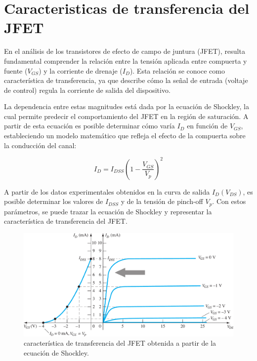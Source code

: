 \chapter{Caracteristicas de transferencia del JFET}
  En el análisis de los transistores de efecto de campo de juntura (JFET), resulta fundamental comprender la relación
  entre la tensión aplicada entre compuerta y fuente (\(V_{GS}\)) y la corriente de drenaje (\(I_D\)). Esta relación se
  conoce como característica de transferencia, ya que describe cómo la señal de entrada (voltaje de control)
  regula la corriente de salida del dispositivo.  

  La dependencia entre estas magnitudes está dada por la ecuación de Shockley, la cual permite predecir el
  comportamiento del JFET en la región de saturación. A partir de esta ecuación es posible determinar cómo varía \(I_D\)
  en función de \(V_{GS}\), estableciendo un modelo matemático que refleja el efecto de la compuerta sobre la conducción
  del canal:  

  \begin{equation}
    I_D = I_{DSS} \left( 1 - \frac{V_{GS}}{V_p} \right)^2
  \end{equation}
  
  A partir de los datos experimentales obtenidos en la curva de salida \(I_D(V_{DS})\), es posible determinar los
  valores de \(I_{DSS}\) y de la tensión de pinch-off \(V_p\). Con estos parámetros, se puede trazar la ecuación de
  Shockley y representar la característica de transferencia del JFET.  
  
  \begin{figure}[!ht]
    \centering
    \includegraphics[width=1\textwidth]{images/grafico_transferencia.png}
    \caption{característica de transferencia del JFET obtenida a partir de la ecuación de Shockley.}
    \label{fig:transferencia}
  \end{figure}

